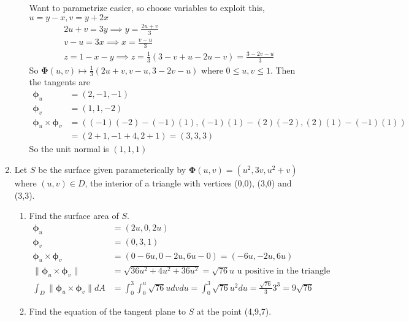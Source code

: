 \documentclass{article}
\newcommand{\norm}[1]{\| #1 \|}
\begin{document}
\begin{enumerate}
\begin{enumerate}
        Want to parametrize easier, so choose variables to exploit this, $u = y - x, v = y + 2x$
        \begin{align*}
            2u + v = 3y \implies y = \frac{2u + v}{3} \\
            v - u = 3x \implies x = \frac{v - u}{3} \\
            z = 1 - x - y \implies z = \frac{1}{3}(3 -v + u -2u -v) = \frac{3 -2v -u}{3}
        \end{align*}
        So $\boldsymbol \Phi(u,v) \mapsto \frac{1}{3}(2u + v, v - u, 3 - 2v -u)$ where $0 \leq u , v \leq 1$.
        Then the tangents are
        \begin{align*}
            \boldsymbol \phi_u &= (2, -1, -1) \\
            \boldsymbol \phi_v &= (1,1,-2) \\
            \boldsymbol \phi_u \times \boldsymbol \phi_v &= ((-1)(-2) - (-1)(1), (-1)(1) - (2)(-2), (2)(1) - (-1)(1)) \\
            &= (2 + 1, -1 + 4, 2 + 1) = (3,3,3)
        \end{align*}
        So the unit normal is $(1,1,1)$
    \end{enumerate}
    \newpage
    \item Let $S$ be the surface given parameterically by $\boldsymbol \Phi (u,v) = (u^2, 3v, u^2 + v)$ where $(u,v) \in D$, the interior of a triangle with vertices (0,0), (3,0) and (3,3).
    \begin{enumerate}
        \item Find the surface area of $S$.
        \begin{align*}
            \boldsymbol \phi_u &= (2u, 0, 2u) \\
            \boldsymbol \phi_v &= (0, 3, 1) \\
            \boldsymbol \phi_u \times \boldsymbol \phi_v &= (0 - 6u, 0 - 2u, 6u - 0) = (-6u, -2u, 6u) \\
            \norm{\boldsymbol \phi_u \times \boldsymbol \phi_v} &= \sqrt{36u^2 + 4u^2 + 36u^2} = \sqrt{76}u \text{ u positive in the triangle}\\
            \int_D \norm{\boldsymbol \phi_u \times \boldsymbol \phi_v} dA &= \int_0^3\int_0^u \sqrt{76}u dv du = \int_0^3 \sqrt{76}{u^2} du = \frac{\sqrt{76}}{3}3^3 = 9\sqrt{76}        
        \end{align*}
        \item Find the equation of the tangent plane to $S$ at the point (4,9,7).
        

\end{enumerate}
\end{enumerate}
\end{document}
